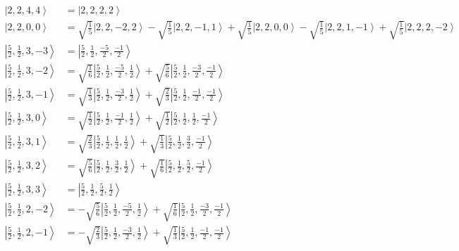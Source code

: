 \documentclass{report}
\newcommand{\ket}[1]{\left| #1 \right>} %
\begin{document}
\begin{align*}
\ket{ 2 ,  2 ,  4 ,  4  } &=  \ket{ 2 ,  2 ,  2 ,  2  } \\
\ket{ 2 ,  2 ,  0 ,  0  } &=  \sqrt{  \frac{1}{5}  } \ket{ 2 ,  2 ,  -2 ,  2  } - \sqrt{  \frac{1}{5}  } \ket{ 2 ,  2 ,  -1 ,  1  } + \sqrt{  \frac{1}{5}  } \ket{ 2 ,  2 ,  0 ,  0  } - \sqrt{  \frac{1}{5}  } \ket{ 2 ,  2 ,  1 ,  -1  } + \sqrt{  \frac{1}{5}  } \ket{ 2 ,  2 ,  2 ,  -2  } \\
\ket{ \frac{5}{2} ,  \frac{1}{2} ,  3 ,  -3  } &=  \ket{ \frac{5}{2} ,  \frac{1}{2} ,  \frac{-5}{2} ,  \frac{-1}{2}  } \\
\ket{ \frac{5}{2} ,  \frac{1}{2} ,  3 ,  -2  } &=  \sqrt{  \frac{1}{6}  } \ket{ \frac{5}{2} ,  \frac{1}{2} ,  \frac{-5}{2} ,  \frac{1}{2}  } + \sqrt{  \frac{5}{6}  } \ket{ \frac{5}{2} ,  \frac{1}{2} ,  \frac{-3}{2} ,  \frac{-1}{2}  } \\
\ket{ \frac{5}{2} ,  \frac{1}{2} ,  3 ,  -1  } &=  \sqrt{  \frac{1}{3}  } \ket{ \frac{5}{2} ,  \frac{1}{2} ,  \frac{-3}{2} ,  \frac{1}{2}  } + \sqrt{  \frac{2}{3}  } \ket{ \frac{5}{2} ,  \frac{1}{2} ,  \frac{-1}{2} ,  \frac{-1}{2}  } \\
\ket{ \frac{5}{2} ,  \frac{1}{2} ,  3 ,  0  } &=  \sqrt{  \frac{1}{2}  } \ket{ \frac{5}{2} ,  \frac{1}{2} ,  \frac{-1}{2} ,  \frac{1}{2}  } + \sqrt{  \frac{1}{2}  } \ket{ \frac{5}{2} ,  \frac{1}{2} ,  \frac{1}{2} ,  \frac{-1}{2}  } \\
\ket{ \frac{5}{2} ,  \frac{1}{2} ,  3 ,  1  } &=  \sqrt{  \frac{2}{3}  } \ket{ \frac{5}{2} ,  \frac{1}{2} ,  \frac{1}{2} ,  \frac{1}{2}  } + \sqrt{  \frac{1}{3}  } \ket{ \frac{5}{2} ,  \frac{1}{2} ,  \frac{3}{2} ,  \frac{-1}{2}  } \\
\ket{ \frac{5}{2} ,  \frac{1}{2} ,  3 ,  2  } &=  \sqrt{  \frac{5}{6}  } \ket{ \frac{5}{2} ,  \frac{1}{2} ,  \frac{3}{2} ,  \frac{1}{2}  } + \sqrt{  \frac{1}{6}  } \ket{ \frac{5}{2} ,  \frac{1}{2} ,  \frac{5}{2} ,  \frac{-1}{2}  } \\
\ket{ \frac{5}{2} ,  \frac{1}{2} ,  3 ,  3  } &=  \ket{ \frac{5}{2} ,  \frac{1}{2} ,  \frac{5}{2} ,  \frac{1}{2}  } \\
\ket{ \frac{5}{2} ,  \frac{1}{2} ,  2 ,  -2  } &=  - \sqrt{  \frac{5}{6}  } \ket{ \frac{5}{2} ,  \frac{1}{2} ,  \frac{-5}{2} ,  \frac{1}{2}  } + \sqrt{  \frac{1}{6}  } \ket{ \frac{5}{2} ,  \frac{1}{2} ,  \frac{-3}{2} ,  \frac{-1}{2}  } \\
\ket{ \frac{5}{2} ,  \frac{1}{2} ,  2 ,  -1  } &=  - \sqrt{  \frac{2}{3}  } \ket{ \frac{5}{2} ,  \frac{1}{2} ,  \frac{-3}{2} ,  \frac{1}{2}  } + \sqrt{  \frac{1}{3}  } \ket{ \frac{5}{2} ,  \frac{1}{2} ,  \frac{-1}{2} ,  \frac{-1}{2}  } \\

\end{align*}
\end{document}
